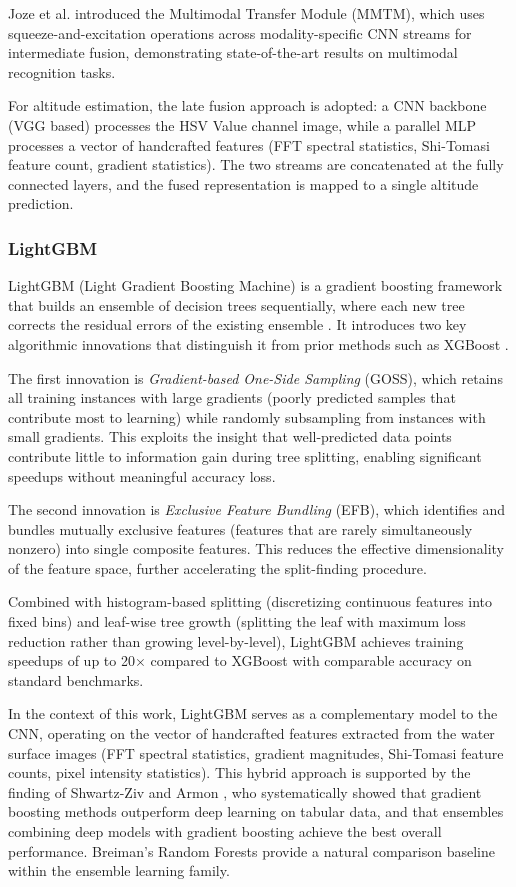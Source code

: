         Joze et al. \cite{MMTM2020} introduced the Multimodal Transfer Module (MMTM), which uses squeeze-and-excitation operations across modality-specific CNN streams for intermediate fusion, demonstrating state-of-the-art results on multimodal recognition tasks.

        For altitude estimation, the late fusion approach is adopted: a CNN backbone (VGG based) processes the HSV Value channel image, while a parallel MLP processes a vector of handcrafted features (FFT spectral statistics, Shi-Tomasi feature count, gradient statistics). The two streams are concatenated at the fully connected layers, and the fused representation is mapped to a single altitude prediction.

    \subsubsection{LightGBM}

    LightGBM (Light Gradient Boosting Machine) is a gradient boosting framework that builds an ensemble of decision trees sequentially, where each new tree corrects the residual errors of the existing ensemble \cite{LightGBM2017}. It introduces two key algorithmic innovations that distinguish it from prior methods such as XGBoost \cite{XGBoost2016}.

    The first innovation is \emph{Gradient-based One-Side Sampling} (GOSS), which retains all training instances with large gradients (poorly predicted samples that contribute most to learning) while randomly subsampling from instances with small gradients. This exploits the insight that well-predicted data points contribute little to information gain during tree splitting, enabling significant speedups without meaningful accuracy loss.

    The second innovation is \emph{Exclusive Feature Bundling} (EFB), which identifies and bundles mutually exclusive features (features that are rarely simultaneously nonzero) into single composite features. This reduces the effective dimensionality of the feature space, further accelerating the split-finding procedure.

    Combined with histogram-based splitting (discretizing continuous features into fixed bins) and leaf-wise tree growth (splitting the leaf with maximum loss reduction rather than growing level-by-level), LightGBM achieves training speedups of up to 20$\times$ compared to XGBoost with comparable accuracy on standard benchmarks.

    In the context of this work, LightGBM serves as a complementary model to the CNN, operating on the vector of handcrafted features extracted from the water surface images (FFT spectral statistics, gradient magnitudes, Shi-Tomasi feature counts, pixel intensity statistics). This hybrid approach is supported by the finding of Shwartz-Ziv and Armon \cite{ShwartzZiv2022}, who systematically showed that gradient boosting methods outperform deep learning on tabular data, and that ensembles combining deep models with gradient boosting achieve the best overall performance. Breiman's Random Forests \cite{Breiman2001} provide a natural comparison baseline within the ensemble learning family.


